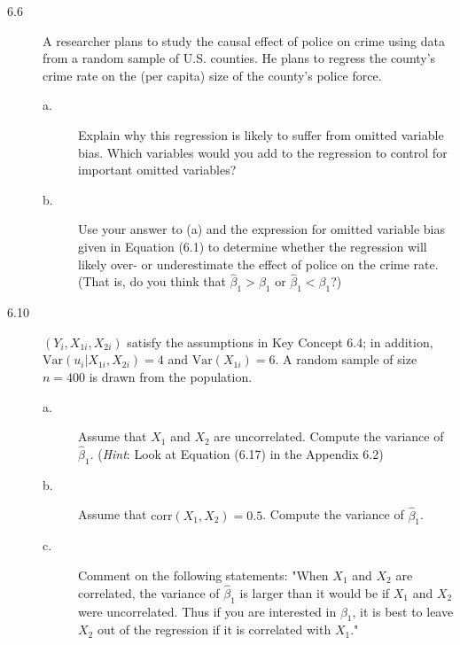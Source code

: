 \documentclass[a4paper,11pt]{article}
\newcommand{\var}{\mathrm{Var}}
\newcommand{\corr}{\mathrm{corr}}
\begin{document}
\begin{description}
\item[{6.6}] A researcher plans to study the causal effect of police on
crime using data from a random sample of U.S. counties. He
plans to regress the county's crime rate on the (per capita)
size of the county's police force.
\begin{description}
\item[{a.}] Explain why this regression is likely to suffer from omitted
variable bias. Which variables would you add to the
regression to control for important omitted variables?
\item[{b.}] Use your answer to (a) and the expression for omitted
variable bias given in Equation (6.1) to determine whether
the regression will likely over- or underestimate the effect
of police on the crime rate. (That is, do you think that
\(\hat{\beta}_1 > \beta_1\) or \(\hat{\beta}_1 < \beta_1\)?)
\end{description}

\item[{6.10}] \((Y_i, X_{1i}, X_{2i})\) satisfy the assumptions in Key
Concept 6.4; in addition, \(\var(u_i | X_{1i}, X_{2i}) = 4\)
and \(\var(X_{1i}) = 6\). A random sample of size \(n=400\) is
drawn from the population.
\begin{description}
\item[{a.}] Assume that \(X_1\) and \(X_2\) are uncorrelated. Compute the
variance of \(\hat{\beta}_1\). (\emph{Hint}: Look at Equation
(6.17) in the Appendix 6.2)
\item[{b.}] Assume that \(\corr(X_1, X_2) = 0.5\). Compute the variance of
\(\hat{\beta}_1\).
\item[{c.}] Comment on the following statements: "When \(X_1\) and \(X_2\)
are correlated, the variance of \(\hat{\beta}_1\) is larger
than it would be if \(X_1\) and \(X_2\) were uncorrelated. Thus
if you are interested in \(\beta_1\), it is best to leave
\(X_2\) out of the
regression if it is correlated with \(X_1\)."
\end{description}


\end{description}
\end{document}
